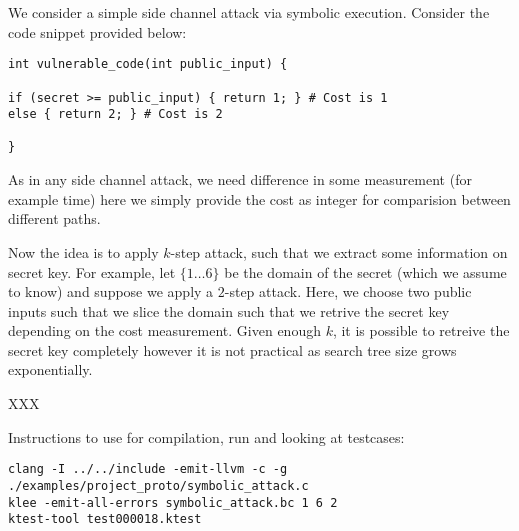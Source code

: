\documentclass[11pt]{report}
\begin{document}
We consider a simple side channel attack via symbolic execution.
Consider the code snippet provided below:
\begin{verbatim}
int vulnerable_code(int public_input) {

if (secret >= public_input) { return 1; } # Cost is 1
else { return 2; } # Cost is 2

}
\end{verbatim}

As in any side channel attack, we need difference in some measurement (for example time) here we simply provide the cost as integer
for comparision between different paths.

Now the idea is to apply $k$-step attack, such that we extract some information on secret key.
For example, let $\{1 \dots 6\}$ be the domain of the secret (which we assume to know) and suppose we apply a $2$-step attack.
Here, we choose two public inputs such that we slice the domain such that we retrive the secret key depending on the cost measurement.
Given enough $k$, it is possible to retreive the secret key completely however it is not practical as search tree size grows exponentially.

XXX

Instructions to use for compilation, run and looking at testcases:
\begin{verbatim}
clang -I ../../include -emit-llvm -c -g ./examples/project_proto/symbolic_attack.c
klee -emit-all-errors symbolic_attack.bc 1 6 2
ktest-tool test000018.ktest
\end{verbatim}



\end{document}
